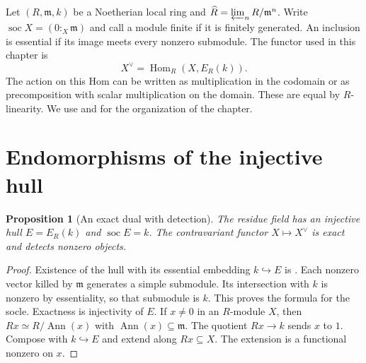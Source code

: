 \documentclass[11pt,oneside,openany]{book}
\newtheorem{proposition}[theorem]{Proposition}
\theoremstyle{definition}
\theoremstyle{remark}
\begin{document}
Let $(R,\mathfrak m,k)$ be a Noetherian local ring and
$\widehat R=\varprojlim_n R/\mathfrak m^n$. Write
$\operatorname{soc}X=(0:_X\mathfrak m)$ and call a module finite if it is
finitely generated. An inclusion is essential if its image meets every
nonzero submodule. The functor used in this chapter is
\[
     X^\vee=\operatorname{Hom}_R(X,E_R(k)).
\]
The action on this Hom can be written as multiplication in the codomain
or as precomposition with scalar multiplication on the domain. These are
equal by $R$-linearity. We use \cite[Sections 6--7]{st-dual} and
\cite[Section 3.2]{bruns} for the organization of the chapter.

\section{Endomorphisms of the injective hull}

\begin{proposition}[An exact dual with detection]\label{res:M01}
The residue field has an injective hull $E=E_R(k)$ and
$\operatorname{soc}E=k$. The contravariant functor $X\mapsto X^\vee$
is exact and detects nonzero objects.
\end{proposition}
\begin{proof}
Existence of the hull with its essential embedding $k\hookrightarrow E$
is \cite[ALG-03-C02-S03]{p103}. Each nonzero vector killed by
$\mathfrak m$ generates a simple submodule. Its intersection with $k$
is nonzero by essentiality, so that submodule is $k$. This proves the
formula for the socle. Exactness is injectivity of $E$. If $x\ne0$ in
an $R$-module $X$, then $Rx\simeq R/\operatorname{Ann}(x)$ with
$\operatorname{Ann}(x)\subseteq\mathfrak m$. The quotient $Rx\to k$
sends $x$ to $1$. Compose with $k\hookrightarrow E$ and extend along
$Rx\subseteq X$. The extension is a functional nonzero on $x$.
\end{proof}
\end{document}
